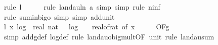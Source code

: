 \begin{isabellebody}
\ {\isacharparenleft}{\kern0pt}rule\ l{}{\isacharparenright}{\kern0pt}\isanewline
\ \ \ \ \isamarkupfalse%
\ {\isacharparenleft}{\kern0pt}rule\ landau{\isacharunderscore}{\kern0pt}ln{\isacharunderscore}{\kern0pt}{}{\isacharbrackleft}{\kern0pt}\ a{\isacharequal}{\kern0pt}{\isachardoublequoteopen}{}{\isachardoublequoteclose}{\isacharbrackright}{\kern0pt}{\isacharcomma}{\kern0pt}\ simp{\isacharcomma}{\kern0pt}\ simp{\isacharcomma}{\kern0pt}\ rule\ n{\isacharunderscore}{\kern0pt}inf{\isacharparenright}{\kern0pt}\isanewline
\ \ \ \ \isamarkupfalse%
\ {\isacharparenleft}{\kern0pt}rule\ sum{\isacharunderscore}{\kern0pt}in{\isacharunderscore}{\kern0pt}bigo{\isacharcomma}{\kern0pt}\ simp{\isacharcomma}{\kern0pt}\ simp\ add{\isacharcolon}{\kern0pt}unit{\isacharunderscore}{\kern0pt}{}{\isacharparenright}{\kern0pt}\isanewline
\ \ \isanewline
\ \ \isamarkupfalse%
\ l{}{\isacharcolon}{\kern0pt}\ {\isachardoublequoteopen}{\isacharparenleft}{\kern0pt}{\isasymlambda}x{\isachardot}{\kern0pt}\ log\ {}\ {\isacharparenleft}{\kern0pt}real\ {\isacharparenleft}{\kern0pt}nat\ {\isacharparenleft}{\kern0pt}{}\ {\isacharasterisk}{\kern0pt}\ {\isasymlceil}log\ {}\ {\isacharparenleft}{\kern0pt}{}\ {\isacharslash}{\kern0pt}\ real{\isacharunderscore}{\kern0pt}of{\isacharunderscore}{\kern0pt}rat\ {\isacharparenleft}{\kern0pt}{\isasymdelta}{\isacharunderscore}{\kern0pt}of\ x{\isacharparenright}{\kern0pt}{\isacharparenright}{\kern0pt}{\isasymrceil}\ {\isacharplus}{\kern0pt}\ {}{}{\isacharparenright}{\kern0pt}{\isacharparenright}{\kern0pt}\ {\isacharplus}{\kern0pt}\ {}{\isacharparenright}{\kern0pt}{\isacharparenright}{\kern0pt}\ {\isasymin}\ O{\isacharbrackleft}{\kern0pt}{\isacharquery}{\kern0pt}F{\isacharbrackright}{\kern0pt}{\isacharparenleft}{\kern0pt}g{\isacharparenright}{\kern0pt}{\isachardoublequoteclose}\isanewline
\ \ \ \ \isamarkupfalse%
\ {\isacharparenleft}{\kern0pt}simp\ add{\isacharcolon}{\kern0pt}g{\isacharunderscore}{\kern0pt}def\ log{\isacharunderscore}{\kern0pt}def{\isacharcomma}{\kern0pt}\ rule\ landau{\isacharunderscore}{\kern0pt}o{\isachardot}{\kern0pt}big{\isacharunderscore}{\kern0pt}mult{\isacharunderscore}{\kern0pt}{}{\isacharprime}{\kern0pt}{\isacharbrackleft}{\kern0pt}OF\ unit{\isacharunderscore}{\kern0pt}{}{\isacharbrackright}{\kern0pt}{\isacharcomma}{\kern0pt}\ rule\ landau{\isacharunderscore}{\kern0pt}sum{\isacharunderscore}{\kern0pt}{}{\isacharparenright}{\kern0pt}\isanewline

\end{isabellebody}
